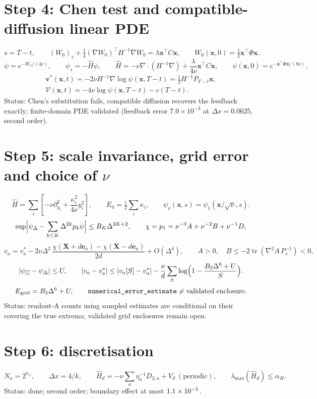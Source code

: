 \documentclass[11pt,a4paper]{article}
\begin{document}
\section*{Step 4: Chen test and compatible-diffusion linear PDE}
\[
 s=T-t,\qquad
 (W_0)_s+\tfrac14(\nabla W_0)^\top H^{-1}\nabla W_0
 =\lambda\mathbf x^\top C\mathbf x,\qquad W_0(\mathbf x,0)=\tfrac12\mathbf x^\top\Phi\mathbf x.
\]
\[
 \boxed{\psi=e^{-W_\nu/(4\nu)},\qquad\psi_s=-\hat H\psi,\qquad
 \hat H=-\nu\nabla\!\cdot(H^{-1}\nabla)+\frac{\lambda}{4\nu}\mathbf x^\top C\mathbf x,\qquad
 \psi(\mathbf x,0)=e^{-\mathbf x^\top\Phi\mathbf x/(8\nu)}.}
\]
\[
 \boxed{\begin{gathered}
 \mathbf v^*(\mathbf x,t)=-2\nu H^{-1}\nabla\log\psi(\mathbf x,T-t)
 =\tfrac12H^{-1}P_{T-t}\mathbf x,\\
 \mathcal V(\mathbf x,t)=-4\nu\log\psi(\mathbf x,T-t)-c(T-t).
 \end{gathered}}
\]
Status: Chen's substitution fails, compatible diffusion recovers the
feedback exactly; finite-domain PDE validated (feedback error
$7.0\times10^{-3}$ at $\Delta x=0.0625$, second order).

\section*{Step 5: scale invariance, grid error and choice of $\nu$}
\[
 \hat H=\sum_i\left[-\nu\partial_{y_i}^2+
 \frac{\kappa_i^2}{4\nu}y_i^2\right],\qquad
 E_0=\tfrac12\sum_i\kappa_i,\qquad
 \psi_\nu(\mathbf x,s)=\psi_1(\mathbf x/\sqrt\nu,s).
\]
\[
 \sup\Bigl|\psi_\Delta-\sum_{k\le K}\Delta^{2k}p_k\psi\Bigr|\le B_K\Delta^{2K+2},\qquad
 \chi=p_1=\nu^{-3}A+\nu^{-2}B+\nu^{-1}D,
\]
\[
 v_a=v_a^*-2\nu\Delta^2\,\frac{\chi(\mathbf X+d\mathbf e_a)-\chi(\mathbf X-d\mathbf e_a)}{2d}+O(\Delta^4),\qquad
 A>0,\quad B\le-2\operatorname{tr}(\nabla^2\!A\,P_s^{-1})<0,
\]
\[
 |\psi_\square-\psi_\Delta|\le U,\qquad
 |v_a-v_a^*|\le|v_a[S]-v_a^*|-\frac\nu d\sum_\pm\log\Bigl(1-\frac{B_2\Delta^6+U}{S}\Bigr).
\]
\[
 E_{\rm grid}=B_2\Delta^6+U,\qquad
 \texttt{numerical\_error\_estimate}\ne\text{validated enclosure}.
\]
Status: readout-A counts using sampled estimates are conditional on their covering the true extrema; validated grid enclosures remain open.

\section*{Step 6: discretisation}
\[
 N_x=2^{n_x},\qquad \Delta x=4/k,\qquad
 \hat H_d=-\nu\sum_a\eta_a^{-1}D_{2,a}+V_d\ (\text{periodic}),\qquad
 \lambda_{\max}(\hat H_d)\le\alpha_H.
\]
Status: done; second order; boundary effect at most $1.1\times10^{-5}$.
\end{document}
